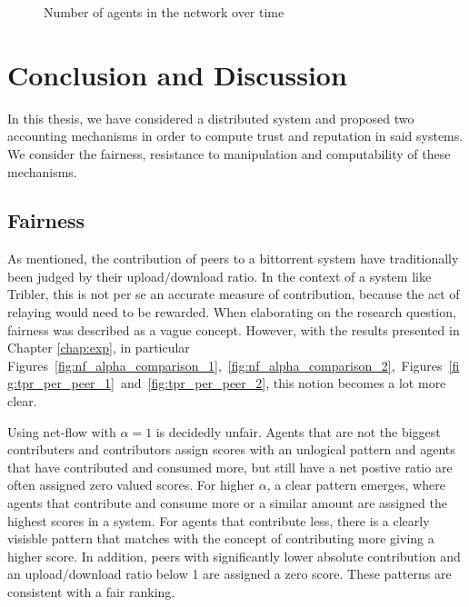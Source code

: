 \documentclass[a4paper,11pt]{book}
\theoremstyle{definition}
\begin{document}

\begin{figure}[ht]
    \centering
    
    \caption{Number of agents in the network over time}
    \label{fig:evolution}
\end{figure}






\chapter{Conclusion and Discussion}

In this thesis, we have considered a distributed system and proposed two accounting mechanisms
in order to compute trust and reputation in said systems. We consider the fairness, resistance
to manipulation and computability of these mechanisms.

\section{Fairness}

As mentioned, the contribution of peers to a bittorrent system have traditionally been judged by their
upload/download ratio. In the context of a system like Tribler, this is not per se an accurate
measure of contribution, because the act of relaying would need to be rewarded. When elaborating on
the research question, fairness was described as a vague concept. However, with the results
presented in Chapter \ref{chap:exp}, in particular 
Figures~\ref{fig:nf_alpha_comparison_1},~\ref{fig:nf_alpha_comparison_2},~Figures~\ref{fig:tpr_per_peer_1}~and~\ref{fig:tpr_per_peer_2},
this notion becomes a lot more clear. 

Using net-flow with $\alpha=1$ is decidedly unfair. 
Agents that are not the biggest contributers and contributors assign scores with an unlogical pattern and
agents that have contributed and consumed more, but still have a net postive ratio are often assigned
zero valued scores. For higher $\alpha$, a clear pattern emerges, where agents that contribute
and consume more or a similar amount are assigned the highest scores in a system. For agents
that contribute less, there is a clearly visisble pattern that matches with the concept of 
contributing more giving a higher score. In addition, peers with significantly lower absolute contribution
and an upload/download ratio below 1 are assigned a zero score. These patterns are consistent with a fair
ranking.
\end{document}
